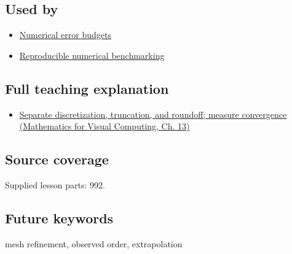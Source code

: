 \subsection{Used by}\label{appendix-aca80b6bf17a-used-by}

\begin{itemize}
\tightlist
\item
  \hyperref[appendix-31b8c295e05f]{Numerical error budgets}
\item
  \hyperref[appendix-b9db93e28371]{Reproducible numerical benchmarking}
\end{itemize}

\subsection{Full teaching explanation}\label{appendix-aca80b6bf17a-full-teaching-explanation}

\begin{itemize}
\tightlist
\item
  \href{../02-Mathematics-for-Visual-Computing/main.pdf\#nameddest=02-foundations-ii-ch029-separate-discretization-truncation-and-roundoff-measure-convergence}{Separate discretization, truncation, and roundoff; measure convergence (Mathematics for Visual Computing, Ch. 13)}
\end{itemize}

\subsection{Source coverage}\label{appendix-aca80b6bf17a-source-coverage}

Supplied lesson parts: 992.

\subsection{Future keywords}\label{appendix-aca80b6bf17a-future-keywords}

mesh refinement, observed order, extrapolation
